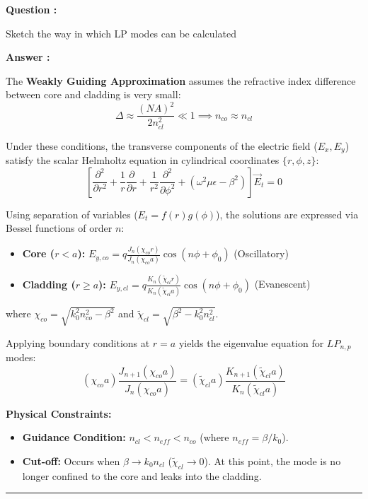 \documentclass[a4paper,11pt]{book}
\newcounter{qacount}
\newenvironment{question}{
  \refstepcounter{qacount}
  \vspace{1em} %
  \noindent\textbf{Question \theqacount:}\space
}{
  \par %
}
\newenvironment{answer}{
  \noindent\textbf{Answer \theqacount:}\space
}{
  \par\vspace{1em}   %
  \hrule             %
  \vspace{0.5em}     %
}
\begin{document}
\begin{question}
    Sketch the way in which LP modes can be calculated
\end{question}

\begin{answer}

    The \textbf{Weakly Guiding Approximation} assumes the refractive index difference between core and cladding is very small:
    \begin{equation}
        \Delta \approx \frac{(NA)^2}{2n_{cl}^2} \ll 1 \implies n_{co} \approx n_{cl}
    \end{equation}

    Under these conditions, the transverse components of the electric field ($E_x, E_y$) satisfy the scalar Helmholtz equation in cylindrical coordinates $\{r, \phi, z\}$:
    \begin{equation}
        \left[ \frac{\partial^2}{\partial r^2} + \frac{1}{r}\frac{\partial}{\partial r} + \frac{1}{r^2}\frac{\partial^2}{\partial \phi^2} + (\omega^2\mu\epsilon - \beta^2) \right] \vec{E}_t = 0
    \end{equation}

    \noindent Using separation of variables ($E_t = f(r)g(\phi)$), the solutions are expressed via Bessel functions of order $n$:
    \begin{itemize}
        \item \textbf{Core ($r < a$):} $E_{y,co} = q \frac{J_n(\chi_{co}r)}{J_n(\chi_{co}a)} \cos(n\phi + \phi_0)$ (Oscillatory)
        \item \textbf{Cladding ($r \geq a$):} $E_{y,cl} = q \frac{K_n(\tilde{\chi}_{cl}r)}{K_n(\tilde{\chi}_{cl}a)} \cos(n\phi + \phi_0)$ (Evanescent)
    \end{itemize}
    where $\chi_{co} = \sqrt{k_0^2 n_{co}^2 - \beta^2}$ and $\tilde{\chi}_{cl} = \sqrt{\beta^2 - k_0^2 n_{cl}^2}$.

    \noindent Applying boundary conditions at $r=a$ yields the eigenvalue equation for $LP_{n,p}$ modes:
    \begin{equation}
        (\chi_{co} a) \frac{J_{n+1}(\chi_{co}a)}{J_{n}(\chi_{co}a)} = (\tilde{\chi}_{cl} a) \frac{K_{n+1}(\tilde{\chi}_{cl}a)}{K_{n}(\tilde{\chi}_{cl}a)}
    \end{equation}

    \textbf{Physical Constraints:}
    \begin{itemize}
        \item \textbf{Guidance Condition:} $n_{cl} < n_{eff} < n_{co}$ (where $n_{eff} = \beta/k_0$).
        \item \textbf{Cut-off:} Occurs when $\beta \to k_0 n_{cl}$ ($\tilde{\chi}_{cl} \to 0$). At this point, the mode is no longer confined to the core and leaks into the cladding.
    \end{itemize}
\end{answer}
\end{document}
